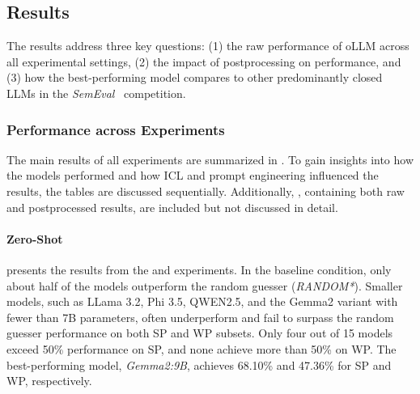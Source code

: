 \subsection{Results}

The results address three key questions: (1) the raw performance of \ac{oLLM} across all experimental settings, (2) the impact of postprocessing on performance, and (3) how the best-performing model compares to other predominantly closed \acp{LLM} in the \textit{SemEval}~\cite{jiangSemEval2024Task92024} competition.


\subsubsection{Performance across Experiments}
\label{sec:performance-across-experiments}

The main results of all experiments are summarized in . To gain insights into how the models performed and how \ac{ICL} and prompt engineering influenced the results, the tables are discussed sequentially. Additionally, , containing both raw and postprocessed results, are included but not discussed in detail.

\paragraph{Zero-Shot}

 presents the results from the  and  experiments. In the baseline condition, only about half of the models outperform the random guesser (\textit{RANDOM*}). Smaller models, such as LLama 3.2, Phi 3.5, QWEN2.5, and the Gemma2 variant with fewer than 7B parameters, often underperform and fail to surpass the random guesser performance on both \ac{SP} and \ac{WP} subsets. Only four out of 15 models exceed 50\% performance on \ac{SP}, and none achieve more than 50\% on \ac{WP}. The best-performing model, \textit{Gemma2:9B}, achieves 68.10\% and 47.36\% for \ac{SP} and \ac{WP}, respectively.

